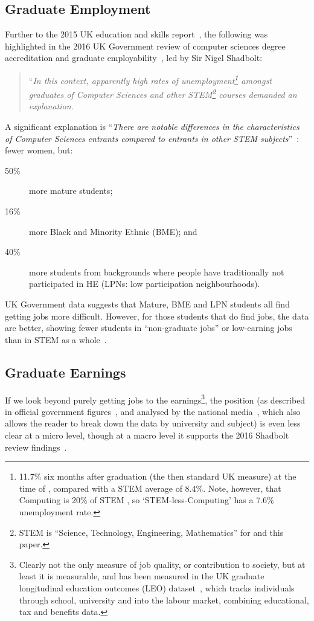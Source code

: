 \documentclass[conference]{IEEEtran}
\begin{document}
\subsection{Graduate Employment}

Further to the 2015 UK education and skills report~\cite{UKCES2015b},
the following was highlighted in the 2016 UK Government
review of computer sciences degree accreditation and graduate
employability~\cite{Shadbolt2016a}, led by Sir Nigel Shadbolt:

\begin{quote} ``{\emph{In this context, apparently high rates of
unemployment\footnote{11.7\% six months after graduation (the then standard
UK measure) at the time of \cite{Shadbolt2016a}, compared with a STEM
average of 8.4\%. Note, however, that Computing is 20\% of STEM
\cite[Table 1]{Wakeham2016a}, so `STEM-less-Computing' has a 7.6\%
unemployment rate.} amongst graduates of Computer Sciences and other
STEM\footnote{STEM is ``Science, Technology, Engineering,
Mathematics'' for \cite{Shadbolt2016a} and this paper.} courses
demanded an explanation.}}
\end{quote}

A significant explanation is ``{\emph{There are notable differences in the
characteristics of Computer Sciences entrants compared to entrants in
other STEM subjects}}''~\cite[\P2.6]{Shadbolt2016a}: fewer women, but:

\begin{description}
\item[50\% ]more mature students;
\item[16\% ]more Black and Minority Ethnic (BME); and
\item[40\% ]more students from backgrounds where people have
traditionally not participated in HE (LPNs: low participation
neighbourhoods).
\end{description}

UK Government data suggests that Mature, BME and LPN students all find
getting jobs more difficult. However, for those students that do find
jobs, the data are better, showing fewer students in ``non-graduate
jobs'' or low-earning jobs than in STEM as a whole~\cite[Figure
6]{Shadbolt2016a}.

\subsection{Graduate Earnings}
If we look beyond purely getting jobs to the earnings\footnote{Clearly
not the only measure of job quality, or contribution to society, but
at least it is measurable, and has been measured in the UK graduate
longitudinal education outcomes (LEO) dataset~\cite{DfE2017a}, which
tracks individuals through school, university and into the labour
market, combining educational, tax and benefits data.}, the position
(as described in official government figures~\cite{DfE2018d}, and
analysed by the national media~\cite{BBC2018f}, which also allows the
reader to break down the data by university and subject) is even less
clear at a micro level, though at a macro level it
supports the 2016 Shadbolt review findings~\cite{Shadbolt2016a}.
\end{document}
